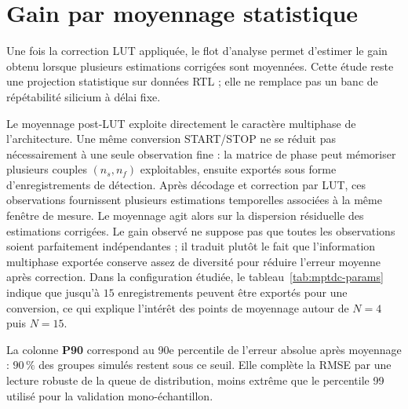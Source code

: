 \section{Gain par moyennage statistique}

Une fois la correction LUT appliquée, le flot d'analyse permet d'estimer le gain obtenu lorsque plusieurs estimations corrigées sont moyennées. Cette étude reste une projection statistique sur données RTL ; elle ne remplace pas un banc de répétabilité silicium à délai fixe.

Le moyennage post-LUT exploite directement le caractère multiphase de l'architecture. Une même conversion START/STOP ne se réduit pas nécessairement à une seule observation fine : la matrice de phase peut mémoriser plusieurs couples \((n_s,n_f)\) exploitables, ensuite exportés sous forme d'enregistrements de détection. Après décodage et correction par LUT, ces observations fournissent plusieurs estimations temporelles associées à la même fenêtre de mesure. Le moyennage agit alors sur la dispersion résiduelle des estimations corrigées. Le gain observé ne suppose pas que toutes les observations soient parfaitement indépendantes ; il traduit plutôt le fait que l'information multiphase exportée conserve assez de diversité pour réduire l'erreur moyenne après correction. Dans la configuration étudiée, le tableau~\ref{tab:mptdc-params} indique que jusqu'à \(15\) enregistrements peuvent être exportés pour une conversion, ce qui explique l'intérêt des points de moyennage autour de \(N=4\) puis \(N=15\).

La colonne \textbf{P90} correspond au 90e percentile de l'erreur absolue après moyennage : $90\,\%$ des groupes simulés restent sous ce seuil. Elle complète la RMSE par une lecture robuste de la queue de distribution, moins extrême que le percentile 99 utilisé pour la validation mono-échantillon.

